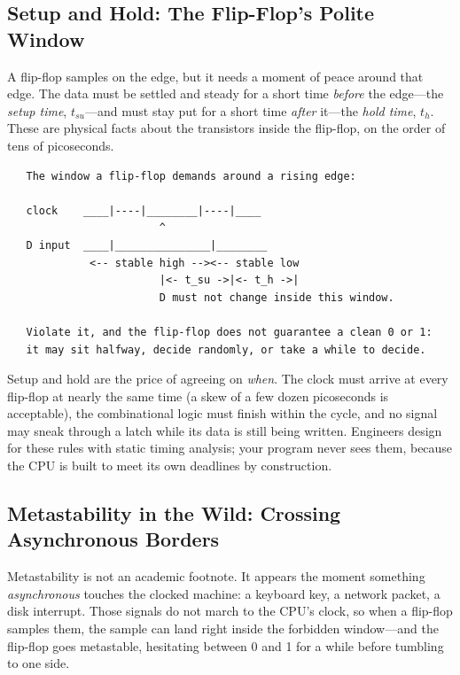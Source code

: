 \subsection{Setup and Hold: The Flip-Flop's Polite Window}

A flip-flop samples on the edge, but it needs a moment of peace around
that edge. The data must be settled and steady for a short time
\emph{before} the edge---the \emph{setup time}, $t_{su}$---and must
stay put for a short time \emph{after} it---the \emph{hold time},
$t_{h}$. These are physical facts about the transistors inside the
flip-flop, on the order of tens of picoseconds.

\begin{verbatim}
   The window a flip-flop demands around a rising edge:

   clock    ____|----|________|----|____
                        ^
   D input  ____|_______________|________
             <-- stable high --><-- stable low
                        |<- t_su ->|<- t_h ->|
                        D must not change inside this window.

   Violate it, and the flip-flop does not guarantee a clean 0 or 1:
   it may sit halfway, decide randomly, or take a while to decide.
\end{verbatim}

Setup and hold are the price of agreeing on \emph{when}. The clock
must arrive at every flip-flop at nearly the same time (a skew of a
few dozen picoseconds is acceptable), the combinational logic must
finish within the cycle, and no signal may sneak through a latch
while its data is still being written. Engineers design for these
rules with static timing analysis; your program never sees them,
because the CPU is built to meet its own deadlines by construction.

\subsection{Metastability in the Wild: Crossing Asynchronous Borders}

Metastability is not an academic footnote. It appears the moment
something \emph{asynchronous} touches the clocked machine: a keyboard
key, a network packet, a disk interrupt. Those signals do not march to
the CPU's clock, so when a flip-flop samples them, the sample can land
right inside the forbidden window---and the flip-flop goes metastable,
hesitating between 0 and 1 for a while before tumbling to one side.

